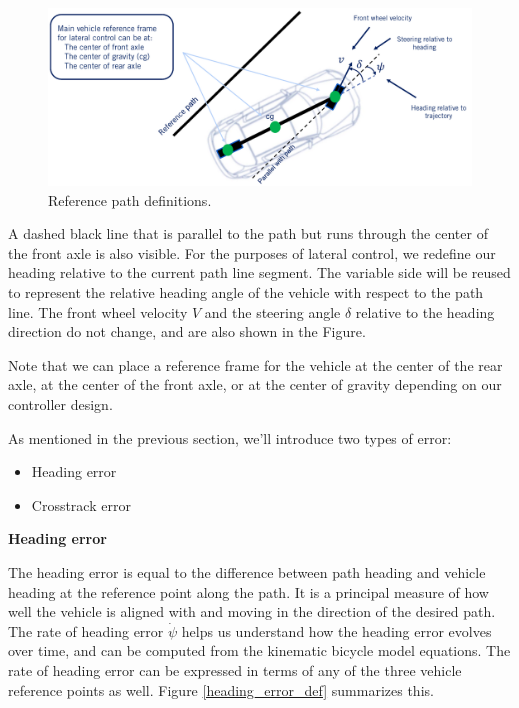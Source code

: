 \begin{figure}[!htb]
\begin{center}
\includegraphics[scale=0.280]{img/lateral_control/reference_path_2.jpeg}
\end{center}
\caption{Reference path definitions.}
\label{reference_path_2}
\end{figure}

A dashed black line that is parallel to the path but runs through the center of the front axle is also visible. 
For the purposes of lateral control, we redefine our heading relative to the current path line segment. The variable side will
be reused to represent the relative heading angle of the vehicle with respect
to the path line. The front wheel velocity $V$ and the steering angle $\delta$ relative to the heading direction 
do not change, and are also shown in the Figure. 


\begin{framed}
\theoremstyle{remark}
\begin{remark}{}

Note that we can place
a reference frame for the vehicle at the center
of the rear axle, at the center of the front axle, or at the center of gravity
depending on our controller design.
\end{remark}
\end{framed}

As mentioned in the previous section, we'll introduce two types of error:

\begin{itemize}
\item Heading error 
\item Crosstrack error
\end{itemize}

\textbf{Heading error}

The heading error is equal to the difference between path heading and vehicle heading at
the reference point along the path. It is a principal measure of how well the vehicle is aligned with and moving in
the direction of the desired path. The rate of heading error $\dot{\psi}$ helps us understand how the heading
error evolves over time, and can be computed from the kinematic bicycle model equations. The rate of heading error
can be expressed in terms of any of the three vehicle reference points as well. Figure \ref{heading_error_def} summarizes this.

